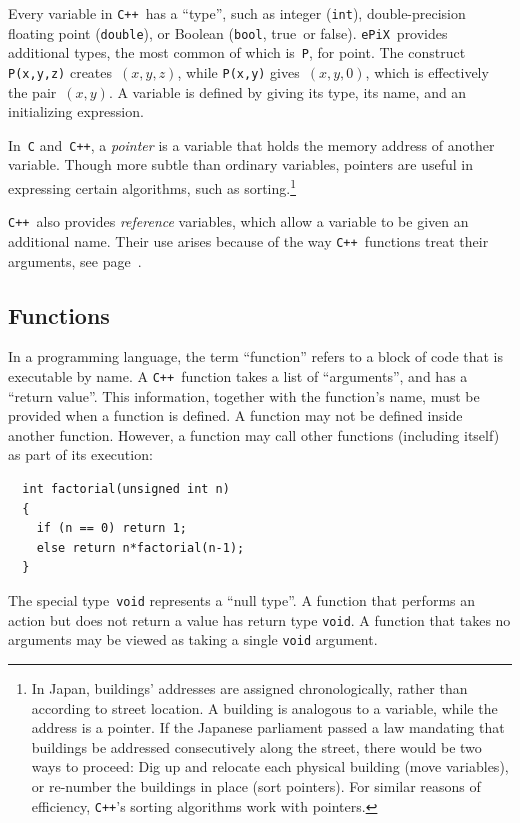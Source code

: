 \documentclass[12pt]{report}
\newcommand{\code}[1]{\texttt{#1}}
\newcommand{\ePiX}{\code{ePiX}}
\newcommand{\CXX}{\code{C++}}
\begin{document}
Every variable in \CXX\ has a ``type'',
such as integer (\code{int}), double-precision floating point
(\code{double}), or Boolean (\code{bool}, true~or false).  \ePiX\ 
provides additional types, the most common of which is~\code{P}, for
point. The construct \code{P(x,y,z)} creates~$(x,y,z)$, while
\code{P(x,y)} gives~$(x,y,0)$, which is effectively the pair~$(x,y)$.
A variable is defined by giving its type, its name, and an
initializing expression.

In~\code{C} and~\CXX, a \emph{pointer} is a variable that holds the
memory address of another variable. Though more subtle than ordinary
variables, pointers are useful in expressing certain algorithms, such
as sorting.\footnote{In Japan, buildings' addresses are assigned
chronologically, rather than according to street location. A building
is analogous to a variable, while the address is a pointer. If the
Japanese parliament passed a law mandating that buildings be addressed
consecutively along the street, there would be two ways to proceed:
Dig up and relocate each physical building (move variables), or
re-number the buildings in place (sort pointers). For similar reasons
of efficiency, \CXX's sorting algorithms work with pointers.}

\CXX\ also provides \emph{reference} variables, which allow a variable
to be given an additional name. Their use arises because of the way
\CXX\ functions treat their arguments, see page~\pageref{references}.


\subsection*{Functions}

 In a programming language, the term ``function''
refers to a block of code that is executable by name.  A \CXX\ 
function takes a list of ``arguments'', and has a ``return value''.
This information, together with the function's name, must be provided
when a function is defined.  A function may not be defined inside
another function. However, a function may call other functions
(including itself) as part of its execution:
\begin{verbatim}
  int factorial(unsigned int n)
  {
    if (n == 0) return 1;
    else return n*factorial(n-1);
  }
\end{verbatim}

The special type~\code{void} represents a ``null type''. A function
that performs an action but does not return a value has return type
\code{void}. A function that takes no arguments may be viewed as
taking a single \code{void} argument.
\end{document}
